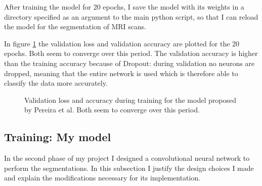 \documentclass[12pt,a4paper,twoside,openright]{report}
\newlength\figureheight
\newlength\figurewidth
\begin{document}
After training the model for 20 epochs, I save the model with its weights in a directory specified as an argument to the main python script, so that I can reload the model for the segmentation of MRI scans. 

In figure \ref{fig:pereira_validation_loss} the validation loss and validation accuracy are plotted for the 20 epochs. Both seem to converge over this period. The validation accuracy is higher than the training accuracy because of Dropout: during validation no neurons are dropped, meaning that the entire network is used which is therefore able to classify the data more accurately.

\begin{figure}
	\centering
	\setlength\figureheight{10cm}
	\setlength{}
	
	\caption[Validation loss and accuracy during training for the model proposed by Pereira et al.]{Validation loss and accuracy during training for the model proposed by Pereira et al. Both seem to converge over this period.}
	\label{fig:pereira_validation_loss}
\end{figure}

\subsection{Training: My model}
In the second phase of my project I designed a convolutional neural network to perform the segmentations. In this subsection I justify the design choices I made and explain the modifications necessary for its implementation.
\end{document}

